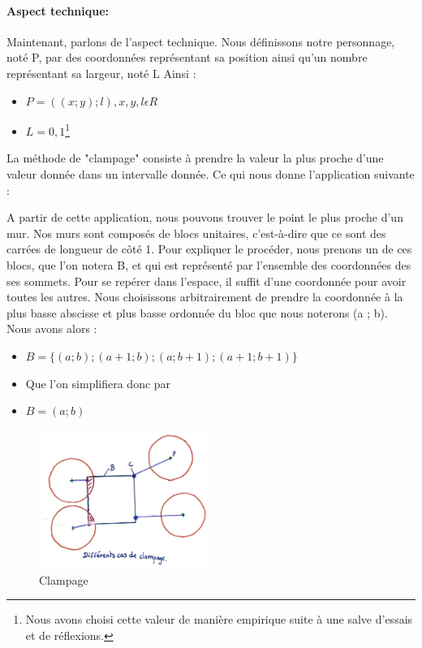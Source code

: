 \documentclass[11pt]{article}
\begin{document}
\paragraph{Aspect technique: }
Maintenant, parlons de l'aspect technique.
Nous définissons notre personnage, noté P, par des coordonnées représentant 
sa position ainsi qu'un nombre représentant sa largeur, noté L Ainsi :

\begin{itemize}
	\item[] $P = ((x ; y) ; l), x, y, l \epsilon R$ 
	\item[] $L = 0,1$\footnote{Nous avons choisi cette valeur de manière 
	empirique suite à une salve d'essais et de réflexions.}
\end{itemize}

La méthode de "clampage" consiste à prendre la valeur la plus proche d'une 
valeur donnée dans un intervalle donnée.
Ce qui nous donne l'application suivante :



A partir de cette application, nous pouvons trouver le point le plus proche 
d'un mur. Nos murs sont composés de blocs unitaires, c'est-à-dire que ce 
sont des carrées de longueur de côté 1. Pour expliquer le procéder, nous 
prenons un de ces blocs, que l'on notera B, et qui est représenté par 
l'ensemble des coordonnées des ses sommets. Pour se repérer dans l'espace, 
il suffit d'une coordonnée pour avoir toutes les autres. Nous choisissons 
arbitrairement de prendre la coordonnée à la plus basse abscisse et plus 
basse ordonnée du bloc que nous noterons (a ; b). Nous avons alors :

\begin{itemize}
	\item[]	$B = \{(a ; b) ; (a + 1 ; b) ; (a ; b + 1) ; (a + 1 ; b + 1)\}$
	\item[] Que l'on simplifiera donc par
	\item[] $B = (a ; b)$
\end{itemize}

\begin{figure}
	\centering
	\includegraphics[width=0.5\textwidth]{image/fig4.jpg}
	\caption{Clampage}
	\label{fig:clampage}
\end{figure}
\end{document}

